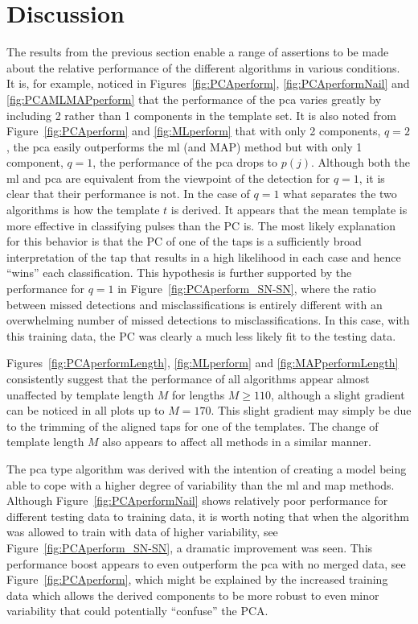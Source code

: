 \section{Discussion}

The results from the previous section enable a range of assertions to be made about the relative performance of the different algorithms in various conditions. It is, for example, noticed in Figures~\ref{fig:PCAperform}, \ref{fig:PCAperformNail} and \ref{fig:PCAMLMAPperform} that the performance of the \gls{pca} varies greatly by including 2 rather than 1 components in the template set. It is also noted from Figure~\ref{fig:PCAperform} and \ref{fig:MLperform} that with only 2 components, $q=2$, the \gls{pca} easily outperforms the \gls{ml} (and MAP) method but with only 1 component, $q=1$, the performance of the \gls{pca} drops to $p(j)$. Although both the \gls{ml} and \gls{pca} are equivalent from the viewpoint of the detection for $q=1$, it is clear that their performance is not. In the case of $q=1$ what separates the two algorithms is how the template $t$ is derived. It appears that the mean template is more effective in classifying pulses than the PC is. The most likely explanation for this behavior is that the PC of one of the taps is a sufficiently broad interpretation of the tap that results in a high likelihood in each case and hence ``wins'' each classification. This hypothesis is further supported by the performance for $q=1$ in Figure~\ref{fig:PCAperform_SN-SN}, where the ratio between missed detections and misclassifications is entirely different with an overwhelming number of missed detections to misclassifications. In this case, with this training data, the PC was clearly a much less likely fit to the testing data.

Figures~\ref{fig:PCAperformLength}, \ref{fig:MLperform} and \ref{fig:MAPperformLength} consistently suggest that the performance of all algorithms appear almost unaffected by template length $M$ for lengths $M\geq110$, although a slight gradient can be noticed in all plots up to $M=170$. This slight gradient may simply be due to the trimming of the aligned taps for one of the templates. The change of template length $M$ also appears to affect all methods in a similar manner.

The \gls{pca} type algorithm was derived with the intention of creating a model being able to cope with a higher degree of variability than the \gls{ml} and \gls{map} methods. Although Figure~\ref{fig:PCAperformNail} shows relatively poor performance for different testing data to training data, it is worth noting that when the algorithm was allowed to train with data of higher variability, see Figure~\ref{fig:PCAperform_SN-SN}, a dramatic improvement was seen. This performance boost appears to even outperform the \gls{pca} with no merged data, see Figure~\ref{fig:PCAperform}, which might be explained by the increased training data which allows the derived components to be more robust to even minor variability that could potentially ``confuse'' the PCA.

